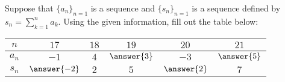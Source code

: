 \documentclass{ximera}
\author{Jim Talamo}
\begin{document}
\begin{exercise}

Suppose that $\{a_n\}_{n=1}$ is a sequence and $\{s_n\}_{n=1}$ is a sequence defined by $s_n = \sum_{k=1}^n a_k$. Using the given information, fill out the table below:  


\begin{tabular}{c||c|c|c|c|c}

$n$ \quad & \quad \quad $17$  \quad \quad & \quad \quad $18$ \quad \quad & \quad \quad $19$ \quad \quad & \quad \quad $20$ \quad \quad & \quad \quad $21$ \quad \quad \\
\hline 
$a_n$ \quad & \quad \quad $-1$  \quad \quad & \quad \quad $4$ \quad \quad  & \quad \quad $\answer{3}$ \quad \quad & \quad \quad  $-3$ \quad \quad & \quad \quad  $\answer{5}$ \quad \quad \\
\hline
$s_n$ \quad & \quad \quad $\answer{-2}$ \quad \quad & \quad \quad $2$ \quad \quad & \quad \quad  $5$ \quad \quad & \quad \quad $\answer{2}$ \quad \quad &  \quad \quad  $7$ \quad \quad \\
\end{tabular}

 
    \end{exercise}
\end{document}

